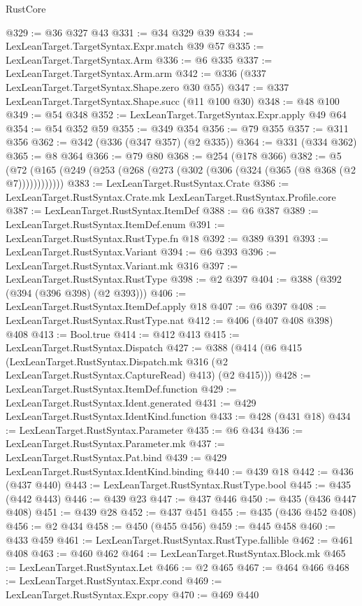 \begin{lexlean}{RustCore}
\begin{coremodule}
@329 := @36 @327 @43
@331 := @34 @329 @39
@334 := LexLeanTarget.TargetSyntax.Expr.match @39 @57
@335 := LexLeanTarget.TargetSyntax.Arm
@336 := @6 @335
@337 := LexLeanTarget.TargetSyntax.Arm.arm
@342 := @336 (@337 LexLeanTarget.TargetSyntax.Shape.zero @30 @55)
@347 := @337 LexLeanTarget.TargetSyntax.Shape.succ (@11 @100 @30)
@348 := @48 @100
@349 := @54 @348
@352 := LexLeanTarget.TargetSyntax.Expr.apply @49 @64
@354 := @54 @352 @59
@355 := @349 @354
@356 := @79 @355
@357 := @311 @356
@362 := @342 (@336 (@347 @357) (@2 @335))
@364 := @331 (@334 @362)
@365 := @8 @364
@366 := @79 @80
@368 := @254 (@178 @366)
@382 := @5 (@72 (@165 (@249 (@253 (@268 (@273 (@302 (@306 (@324 (@365 (@8 @368 (@2 @7))))))))))))
@383 := LexLeanTarget.RustSyntax.Crate
@386 := LexLeanTarget.RustSyntax.Crate.mk LexLeanTarget.RustSyntax.Profile.core
@387 := LexLeanTarget.RustSyntax.ItemDef
@388 := @6 @387
@389 := LexLeanTarget.RustSyntax.ItemDef.enum
@391 := LexLeanTarget.RustSyntax.RustType.fn @18
@392 := @389 @391
@393 := LexLeanTarget.RustSyntax.Variant
@394 := @6 @393
@396 := LexLeanTarget.RustSyntax.Variant.mk @316
@397 := LexLeanTarget.RustSyntax.RustType
@398 := @2 @397
@404 := @388 (@392 (@394 (@396 @398) (@2 @393)))
@406 := LexLeanTarget.RustSyntax.ItemDef.apply @18
@407 := @6 @397
@408 := LexLeanTarget.RustSyntax.RustType.nat
@412 := @406 (@407 @408 @398) @408
@413 := Bool.true
@414 := @412 @413
@415 := LexLeanTarget.RustSyntax.Dispatch
@427 := @388
    (@414
      (@6
        @415
        (LexLeanTarget.RustSyntax.Dispatch.mk @316 (@2 LexLeanTarget.RustSyntax.CaptureRead) @413)
        (@2 @415)))
@428 := LexLeanTarget.RustSyntax.ItemDef.function
@429 := LexLeanTarget.RustSyntax.Ident.generated
@431 := @429 LexLeanTarget.RustSyntax.IdentKind.function
@433 := @428 (@431 @18)
@434 := LexLeanTarget.RustSyntax.Parameter
@435 := @6 @434
@436 := LexLeanTarget.RustSyntax.Parameter.mk
@437 := LexLeanTarget.RustSyntax.Pat.bind
@439 := @429 LexLeanTarget.RustSyntax.IdentKind.binding
@440 := @439 @18
@442 := @436 (@437 @440)
@443 := LexLeanTarget.RustSyntax.RustType.bool
@445 := @435 (@442 @443)
@446 := @439 @23
@447 := @437 @446
@450 := @435 (@436 @447 @408)
@451 := @439 @28
@452 := @437 @451
@455 := @435 (@436 @452 @408)
@456 := @2 @434
@458 := @450 (@455 @456)
@459 := @445 @458
@460 := @433 @459
@461 := LexLeanTarget.RustSyntax.RustType.fallible
@462 := @461 @408
@463 := @460 @462
@464 := LexLeanTarget.RustSyntax.Block.mk
@465 := LexLeanTarget.RustSyntax.Let
@466 := @2 @465
@467 := @464 @466
@468 := LexLeanTarget.RustSyntax.Expr.cond
@469 := LexLeanTarget.RustSyntax.Expr.copy
@470 := @469 @440

\end{coremodule}
\end{lexlean}
